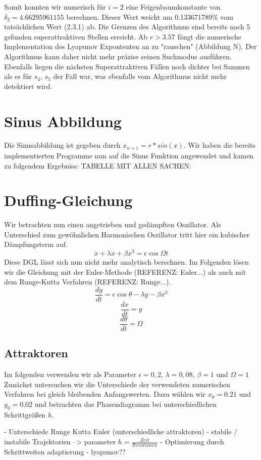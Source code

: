 \documentclass{scrartcl}
\begin{document}
Somit konnten wir numerisch für $i=2$ eine Feigenbaumkonstante von $\delta_2=4.66295961155$ berechnen. Dieser Wert weicht um 0.133671789\% vom tatsächlichen Wert (2.3.1) ab. Die Grenzen des Algorithmus sind bereits nach 5 gefunden superattraktiven Stellen erreicht. Ab $r>3.57$ fängt die numerische Implementation des Lyapunov Expontenten an zu "rauschen" (Abbildung N). Der Algorithmus kann daher nicht mehr präzise seinen Suchmodus ausführen. Ebenfalls liegen die nächsten Superattraktiven Fällen noch dichter bei Sammen als es für $s_4$, $s_5$ der Fall war, was ebenfalls vom Algorithmus nicht mehr detektiert wird. 

\section{Sinus Abbildung}
Die Sinusabbildung ist gegeben durch $x_{n+1}=r*sin(x)$. Wir haben die bereits implementierten Programme nun auf die Sinus Funktion angewendet und kamen zu folgendem Ergebniss:
 TABELLE MIT ALLEN SACHEN:
 
 
 
 
\section { Duffing-Gleichung}
Wir betrachten nun einen angetrieben und gedämpften Oszillator. Als Unterschied zum gewöhnlichen Harmonischen Oszillator tritt hier ein kubischer Dämpfungsterm auf.
$$\ddot{x}+\lambda\dot{x}+\beta x^3=\epsilon\cos{\Omega t}$$
Diese DGL lässt sich nun nicht mehr analytisch berechnen.
Im Folgenden lösen wir die Gleichung mit der Euler-Methode (REFERENZ: Euler...) als auch mit dem Runge-Kutta Verfahren (REFERENZ: Runge...).
$$\frac{dy}{dt}=\epsilon\cos{\theta}-\lambda y - \beta x^3$$
$$\frac{dx}{dt}=y$$
$$\frac{d\theta}{dt}=\Omega$$
\subsection { Attraktoren }
Im folgenden verwenden wir als Parameter $\epsilon = 0,2$, $\lambda = 0,08$, $\beta = 1$ und $\Omega = 1$
Zunächst untersuchen wir die Unterschiede der verwendeten numerischen Verfahren bei gleich bleibenden Anfangswerten. Dazu wählen wir $x_0=0.21$ und $y_0=0.02$ und betrachten das Phasendiagramm bei unterschiedlichen Schrittgrößen $h$.


- Unterschiede Runge Kutta Euler (unterschiedliche attraktoren)
\newline
- stabile / instabile Trajektorien --> parameter $h = \frac{Zeit}{Iterationen}$
\newline
- Optimierung durch Schrittweiten adaptierung
\newline
- lyapunov??
\end{document}
